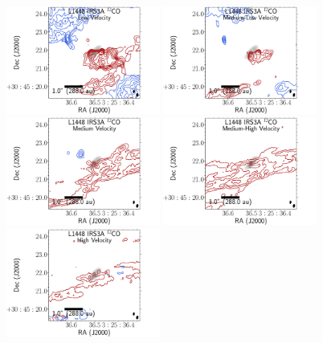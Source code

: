 \begin{figure}[H]
   \begin{center}

\includegraphics[width=0.45\textwidth]{img/L1448IRS3B_12CO_image_binned_clean__ultralow-irs3a.pdf}
\includegraphics[width=0.45\textwidth]{img/L1448IRS3B_12CO_image_binned_clean__low-irs3a.pdf}
\includegraphics[width=0.45\textwidth]{img/L1448IRS3B_12CO_image_binned_clean__med-irs3a.pdf}
\includegraphics[width=0.45\textwidth]{img/L1448IRS3B_12CO_image_binned_clean__high-irs3a.pdf}
\includegraphics[width=0.45\textwidth]{img/L1448IRS3B_12CO_image_binned_clean__ultrahigh-irs3a.pdf}

\end{center}
\end{figure}
